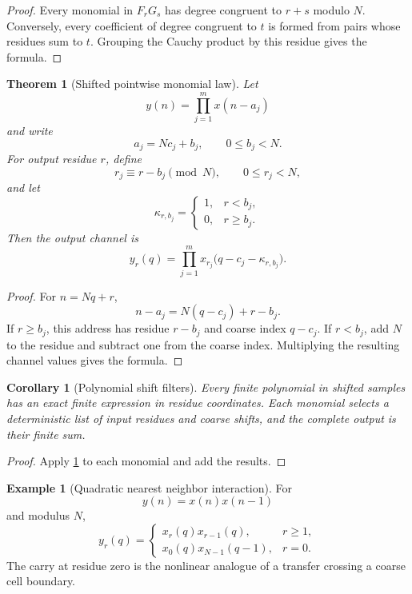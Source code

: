 \documentclass[11pt,letterpaper]{article}
\newtheorem{theorem}{Theorem}[section]
\theoremstyle{plain}
\theoremstyle{plain}
\theoremstyle{plain}
\newtheorem{corollary}[corollary]{Corollary}
\theoremstyle{definition}
\theoremstyle{definition}
\newtheorem{example}[example]{Example}
\theoremstyle{definition}
\theoremstyle{definition}
\theoremstyle{remark}
\theoremstyle{remark}
\theoremstyle{remark}
\theoremstyle{remark}
\begin{document}
\begin{proof}
Every monomial in \(F_rG_s\) has degree congruent to \(r+s\) modulo \(N\). Conversely, every coefficient of degree congruent to \(t\) is formed from pairs whose residues sum to \(t\). Grouping the Cauchy product by this residue gives the formula.
\end{proof}

\begin{theorem}[Shifted pointwise monomial law]\label{thm:shifted_monomial_law}
Let
\[
y(n)=\prod_{j=1}^{m}x(n-a_j)
\]
and write
\[
a_j=Nc_j+b_j,
\qquad
0\leq b_j<N.
\]
For output residue \(r\), define
\[
r_j\equiv r-b_j\pmod N,
\qquad
0\leq r_j<N,
\]
and let
\[
\kappa_{r,b_j}
=
\begin{cases}
1,&r<b_j,\\
0,&r\geq b_j.
\end{cases}
\]
Then the output channel is
\[
\boxed{
y_r(q)
=
\prod_{j=1}^{m}
x_{r_j}
\bigl(q-c_j-\kappa_{r,b_j}\bigr).
}
\]
\end{theorem}

\begin{proof}
For \(n=Nq+r\),
\[
n-a_j
=N(q-c_j)+r-b_j.
\]
If \(r\geq b_j\), this address has residue \(r-b_j\) and coarse index \(q-c_j\). If \(r<b_j\), add \(N\) to the residue and subtract one from the coarse index. Multiplying the resulting channel values gives the formula.
\end{proof}

\begin{corollary}[Polynomial shift filters]\label{cor:polynomial_shift_filters}
Every finite polynomial in shifted samples has an exact finite expression in residue coordinates. Each monomial selects a deterministic list of input residues and coarse shifts, and the complete output is their finite sum.
\end{corollary}

\begin{proof}
Apply \cref{thm:shifted_monomial_law} to each monomial and add the results.
\end{proof}

\begin{example}[Quadratic nearest neighbor interaction]\label{ex:quadratic_neighbor}
For
\[
y(n)=x(n)x(n-1)
\]
and modulus \(N\),
\[
y_r(q)
=
\begin{cases}
x_r(q)x_{r-1}(q),&r\geq1,\\
x_0(q)x_{N-1}(q-1),&r=0.
\end{cases}
\]
The carry at residue zero is the nonlinear analogue of a transfer crossing a coarse cell boundary.
\end{example}
\end{document}
